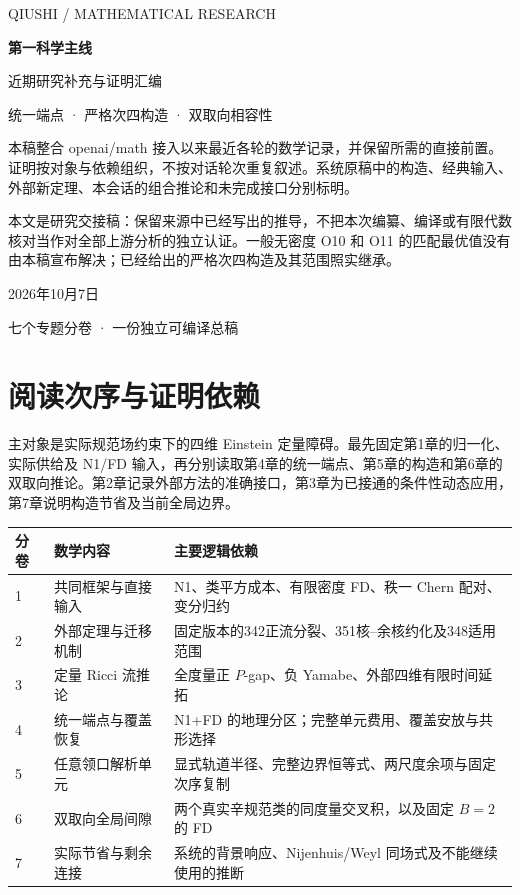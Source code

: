 \documentclass[UTF8,11pt,openany,fontset=none]{ctexbook}
\theoremstyle{definition}
\theoremstyle{remark}
\begin{document}
\begin{titlepage}
\centering
\vspace*{20mm}
{\sffamily\small QIUSHI / MATHEMATICAL RESEARCH\par}
\vspace{13mm}
{\Huge\bfseries 第一科学主线\par}
\vspace{6mm}
{\LARGE 近期研究补充与证明汇编\par}
\vspace{7mm}
{\large 统一端点 · 严格次四构造 · 双取向相容性\par}
\vspace{15mm}
\begin{minipage}{0.84\textwidth}
本稿整合 openai/math 接入以来最近各轮的数学记录，并保留所需的直接前置。证明按对象与依赖组织，不按对话轮次重复叙述。系统原稿中的构造、经典输入、外部新定理、本会话的组合推论和未完成接口分别标明。

本文是研究交接稿：保留来源中已经写出的推导，不把本次编纂、编译或有限代数核对当作对全部上游分析的独立认证。一般无密度 O10 和 O11 的匹配最优值没有由本稿宣布解决；已经给出的严格次四构造及其范围照实继承。
\end{minipage}
\vfill
{\large 2026年10月7日\par}
\vspace{5mm}
{\small 七个专题分卷 · 一份独立可编译总稿\par}
\end{titlepage}
\frontmatter
\chapter*{阅读次序与证明依赖}

主对象是实际规范场约束下的四维 Einstein 定量障碍。最先固定第1章的归一化、实际供给及 N1/FD 输入，再分别读取第4章的统一端点、第5章的构造和第6章的双取向推论。第2章记录外部方法的准确接口，第3章为已接通的条件性动态应用，第7章说明构造节省及当前全局边界。

\begin{longtable}{p{}p{}p{}}
\toprule
分卷&数学内容&主要逻辑依赖\\
\midrule
1&共同框架与直接输入&N1、类平方成本、有限密度 FD、秩一 Chern 配对、变分归约\\
2&外部定理与迁移机制&固定版本的342正流分裂、351核--余核约化及348适用范围\\
3&定量 Ricci 流推论&全度量正 $P$-gap、负 Yamabe、外部四维有限时间延拓\\
4&统一端点与覆盖恢复&N1+FD 的地理分区；完整单元费用、覆盖安放与共形选择\\
5&任意领口解析单元&显式轨道半径、完整边界恒等式、两尺度余项与固定次序复制\\
6&双取向全局间隙&两个真实辛规范类的同度量交叉积，以及固定 $B=2$ 的 FD\\
7&实际节省与剩余连接&系统的背景响应、Nijenhuis/Weyl 同场式及不能继续使用的推断\\
\bottomrule
\end{longtable}
\end{document}
